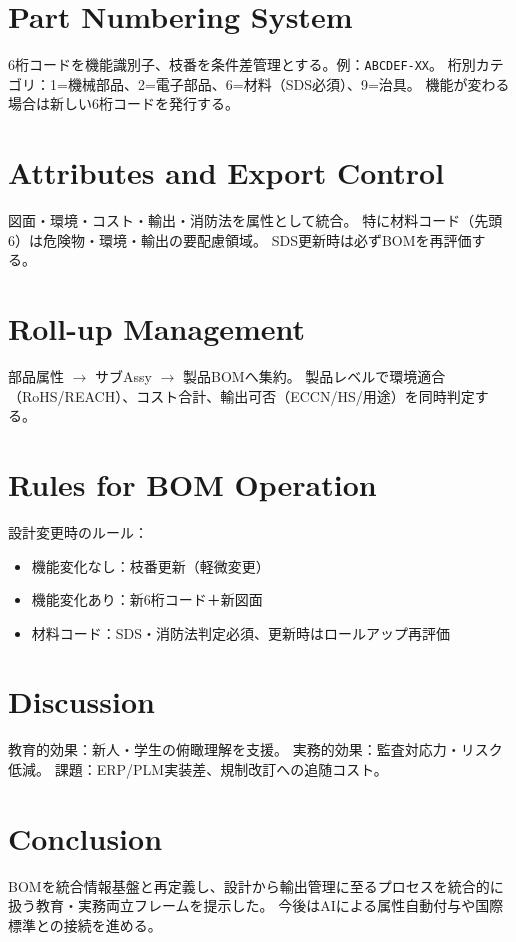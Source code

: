 \documentclass[conference]{IEEEtran}
\begin{document}
\section{Part Numbering System}
6桁コードを機能識別子、枝番を条件差管理とする。例：\texttt{ABCDEF-XX}。  
桁別カテゴリ：1=機械部品、2=電子部品、6=材料（SDS必須）、9=治具。  
機能が変わる場合は新しい6桁コードを発行する。

\section{Attributes and Export Control}
図面・環境・コスト・輸出・消防法を属性として統合。  
特に材料コード（先頭6）は危険物・環境・輸出の要配慮領域。  
SDS更新時は必ずBOMを再評価する。

\section{Roll-up Management}
部品属性 $\rightarrow$ サブAssy $\rightarrow$ 製品BOMへ集約。  
製品レベルで環境適合（RoHS/REACH）、コスト合計、輸出可否（ECCN/HS/用途）を同時判定する。

\section{Rules for BOM Operation}
設計変更時のルール：
\begin{itemize}
  \item 機能変化なし：枝番更新（軽微変更）
  \item 機能変化あり：新6桁コード＋新図面
  \item 材料コード：SDS・消防法判定必須、更新時はロールアップ再評価
\end{itemize}

\section{Discussion}
教育的効果：新人・学生の俯瞰理解を支援。  
実務的効果：監査対応力・リスク低減。  
課題：ERP/PLM実装差、規制改訂への追随コスト。

\section{Conclusion}
BOMを統合情報基盤と再定義し、設計から輸出管理に至るプロセスを統合的に扱う教育・実務両立フレームを提示した。  
今後はAIによる属性自動付与や国際標準との接続を進める。
\end{document}
